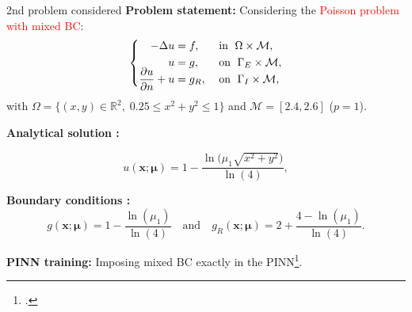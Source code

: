 \begin{frame}{2nd problem considered} 
	\textbf{Problem statement:} Considering the \textcolor{red}{Poisson problem with mixed BC}:
	\vspace{-5pt}
	\begin{equation*}
		\left\{
		\begin{aligned}
			-\Delta u & = f, \; &  & \text{in } \; \Omega \times \mathcal{M}, \\
			u         & = g, \;  &  & \text{on } \; \Gamma_E \times \mathcal{M}, \\
			\smash{\frac{\partial u}{\partial n}}+u  & = g_R, \;  &  & \text{on } \; \Gamma_I \times \mathcal{M},
		\end{aligned}
		\right.
	\end{equation*}

	with $\Omega=\{(x,y)\in\mathbb{R}^2, \; 0.25\le x^2+y^2\le 1\}$ and $\mathcal{M}=[2.4,2.6]$ ($p=1$).
		
	\vspace{8pt}
	\textbf{Analytical solution :}

	\vspace{-12pt}
	\begin{equation*}
		u(\bm{x};\bm{\mu})= 1 - \frac{\ln\big(\mu_1\sqrt{x^2+y^2}\big)}{\ln(4)},
	\end{equation*}
	\vspace{-5pt}
	
	\textbf{Boundary conditions :}
	\begin{equation*}
		g(\bm{x};\bm{\mu})=1 - \frac{\ln(\mu_1)}{\ln(4)} \quad \text{and} \quad g_R(\bm{x};\bm{\mu})=2 + \frac{4-\ln(\mu_1)}{\ln(4)}.
	\end{equation*}

	\vspace{2pt}
	\small
	\textbf{PINN training:} Imposing mixed BC exactly in the PINN\footcite{Sukumar_2022}.

	\vspace{8pt}
\end{frame}

